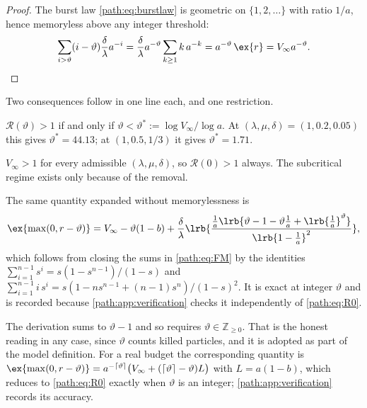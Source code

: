 \begin{proof}
The burst law \cref{path:eq:burstlaw} is geometric on $\{1,2,\dots\}$ with
ratio $1/a$, hence memoryless above any integer threshold:
\[
\sum_{i>\vartheta}(i-\vartheta)\frac{\delta}{\lambda}a^{-i}
=\frac{\delta}{\lambda}a^{-\vartheta}\sum_{k\ge1}k\,a^{-k}
=a^{-\vartheta}\,\ex{r}
=V_\infty a^{-\vartheta}. \qedhere
\]
\end{proof}

Two consequences follow in one line each, and one restriction.

\begin{corollary}[Threshold]
\label{path:cor:threshold}
$\mathcal{R}(\vartheta)>1$ if and only if
$\vartheta<\vartheta^{\ast}:=\log V_\infty/\log a$. At
$(\lambda,\mu,\delta)=(1,0.2,0.05)$ this gives $\vartheta^{\ast}=44.13$; at
$(1,0.5,1/3)$ it gives $\vartheta^{\ast}=1.71$.
\end{corollary}

\begin{corollary}
\label{path:cor:whythreshold}
$V_\infty>1$ for every admissible $(\lambda,\mu,\delta)$, so
$\mathcal{R}(0)>1$ always. The subcritical regime exists only because of the
removal.
\end{corollary}

\begin{remark}
\label{path:rem:partial}
The same quantity expanded without memorylessness is
\begin{equation}
\ex{\max(0,r-\vartheta)}
= V_\infty-\vartheta(1-b)
+ \frac{\delta}{\lambda}
  \lrb{\frac{\frac1a\lrb{\vartheta-1-\vartheta\frac1a+\lrb{\frac1a}^{\vartheta}}}
            {\lrb{1-\frac1a}^{2}}} ,
\label{path:eq:Rintermediate}
\end{equation}
which follows from closing the sums in \cref{path:eq:FM} by the identities
$\sum_{i=1}^{n-1}s^{i}=s(1-s^{n-1})/(1-s)$ and
$\sum_{i=1}^{n-1}i\,s^{i}=s(1-ns^{n-1}+(n-1)s^{n})/(1-s)^{2}$. It is exact
at integer $\vartheta$ and is recorded because
\cref{path:app:verification} checks it independently of
\cref{path:eq:R0}.
\end{remark}

\begin{remark}
\label{path:rem:integer}
The derivation sums to $\vartheta-1$ and so requires
$\vartheta\in\mathbb{Z}_{\ge0}$. That is the honest reading in any case,
since $\vartheta$ counts killed particles, and it is adopted as part of the
model definition. For a real budget the corresponding quantity is
$\ex{\max(0,r-\vartheta)}
=a^{-\lceil\vartheta\rceil}\bigl(V_\infty+(\lceil\vartheta\rceil-\vartheta)L\bigr)$
with $L=a(1-b)$, which reduces to \cref{path:eq:R0} exactly when $\vartheta$
is an integer; \cref{path:app:verification} records its accuracy.
\end{remark}

